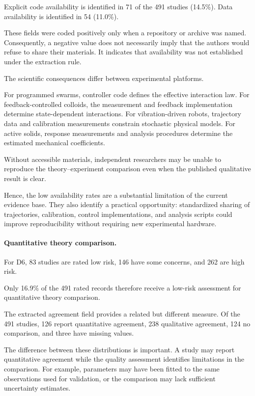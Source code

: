 Explicit code availability is identified
in 71 of the 491 studies
(14.5\%). Data availability is
identified in 54 (11.0\%).

These fields were coded positively
only when a repository or archive
was named. Consequently, a negative
value does not necessarily imply
that the authors would refuse
to share their materials.
It indicates that availability
was not established under
the extraction rule.

The scientific consequences differ
between experimental platforms.

For programmed swarms, controller
code defines the effective
interaction law.
For feedback-controlled colloids,
the measurement and feedback
implementation determine
state-dependent interactions.
For vibration-driven robots,
trajectory data and calibration
measurements constrain
stochastic physical models.
For active solids, response
measurements and analysis
procedures determine the
estimated mechanical coefficients.

Without accessible materials,
independent researchers may be
unable to reproduce the
theory--experiment comparison
even when the published
qualitative result is clear.

Hence, the low availability
rates are a substantial
limitation of the
current evidence base.
They also identify a
practical opportunity:
standardized sharing of
trajectories, calibration,
control implementations,
and analysis scripts
could improve reproducibility
without requiring
new experimental hardware.

\paragraph*{Quantitative theory comparison.}

For D6, 83 studies are rated low risk,
146 have some concerns, and 262
are high risk.

Only 16.9\% of the 491 rated records
therefore receive a low-risk
assessment for quantitative
theory comparison.

The extracted agreement field provides
a related but different measure.
Of the 491 studies,
126 report quantitative agreement,
238 qualitative agreement,
124 no comparison, and three
have missing values.

The difference between these distributions
is important. A study may report
quantitative agreement while
the quality assessment identifies
limitations in the comparison.
For example, parameters may have
been fitted to the same observations
used for validation, or the
comparison may lack sufficient
uncertainty estimates.

